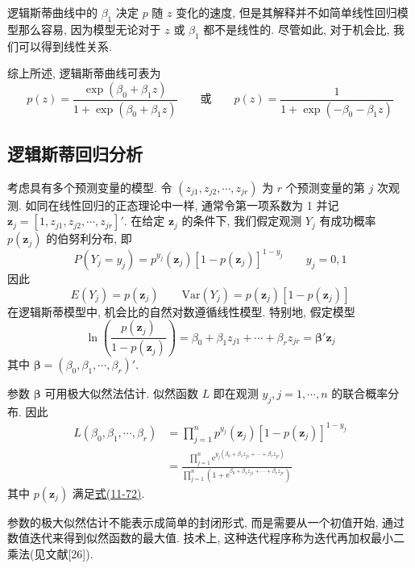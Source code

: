 
逻辑斯蒂曲线中的 $\beta_1$ 决定 $p$ 随 $z$ 变化的速度, 但是其解释并不如简单线性回归模型那么容易, 因为模型无论对于 $z$ 或 $\beta_1$ 都不是线性的. 尽管如此, 对于机会比, 我们可以得到线性关系.

综上所述, 逻辑斯蒂曲线可表为
\[
p(z)=\frac{\exp(\beta_0+\beta_1 z)}{1+\exp(\beta_0+\beta_1 z)}\qquad\text{或}\qquad p(z)=\frac{1}{1+\exp(-\beta_0-\beta_1 z)}
\]

\subsection{逻辑斯蒂回归分析}

考虑具有多个预测变量的模型. 令 $(z_{j1},z_{j2},\cdots,z_{jr})$ 为 $r$ 个预测变量的第 $j$ 次观测. 如同在线性回归的正态理论中一样, 通常令第一项系数为 1 并记 $\mathbf{z}_j=[1,z_{j1},z_{j2},\cdots,z_{jr}]'$. 在给定 $\mathbf{z}_j$ 的条件下, 我们假定观测 $Y_j$ 有成功概率 $p(\mathbf{z}_j)$ 的伯努利分布, 即
\[
P(Y_j=y_j)=p^{y_j}(\mathbf{z}_j)[1-p(\mathbf{z}_j)]^{1-y_j}\qquad y_j=0,1
\]
因此
\[
E(Y_j)=p(\mathbf{z}_j)\qquad \mathrm{Var}(Y_j)=p(\mathbf{z}_j)[1-p(\mathbf{z}_j)]
\]
在逻辑斯蒂模型中, 机会比的自然对数遵循线性模型. 特别地, 假定模型
\label{eq:11-72}
\begin{equation}
\ln\left(\frac{p(\mathbf{z}_j)}{1-p(\mathbf{z}_j)}\right)=\beta_0+\beta_1 z_{j1}+\cdots+\beta_r z_{jr}=\boldsymbol{\beta}'\mathbf{z}_j
\tag{11-72}
\end{equation}
其中 $\boldsymbol{\beta}=(\beta_0,\beta_1,\cdots,\beta_r)'$.

\quad{}\quad 参数 $\boldsymbol{\beta}$ 可用极大似然法估计. 似然函数 $L$ 即在观测 $y_j, j=1,\cdots,n$ 的联合概率分布. 因此
\label{eq:11-73}
\begin{equation}
\begin{aligned}
L(\beta_0,\beta_1,\cdots,\beta_r)&=\prod_{j=1}^{n}p^{y_j}(\mathbf{z}_j)[1-p(\mathbf{z}_j)]^{1-y_j}\\
&=\frac{\prod\limits_{j=1}^{n}\mathrm{e}^{y_j(\beta_0+\beta_1 z_{j1}+\cdots+\beta_r z_{jr})}}{\prod\limits_{j=1}^{n}(1+\mathrm{e}^{\beta_0+\beta_1 z_{j1}+\cdots+\beta_r z_{jr}})}
\end{aligned}
\tag{11-73}
\end{equation}
其中 $p(\mathbf{z}_j)$ 满足\hyperref[eq:11-72]{式(11-72)}.

参数的极大似然估计不能表示成简单的封闭形式, 而是需要从一个初值开始, 通过数值迭代来得到似然函数的最大值. 技术上, 这种迭代程序称为迭代再加权最小二乘法(见文献[26]).

